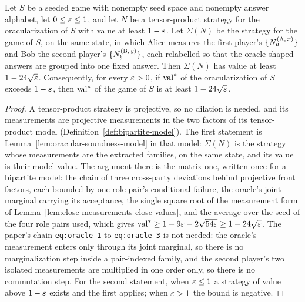 \begin{lemma}
\label{lem:oracular-soundness-tensor}
\leanok
Let $S$ be a seeded game with nonempty seed space and nonempty answer alphabet, let
$0 \leq \varepsilon \leq 1$, and let $N$ be a tensor-product strategy for the oracularization of $S$
with value at least $1 - \varepsilon$. Let $\Sigma(N)$ be the strategy for the game of $S$, on the same
state, in which Alice measures the first player's $\{N^{(\textsc{A},\, x)}_a\}$ and Bob the second
player's $\{N^{(\textsc{B},\, y)}_b\}$, each relabelled so that the oracle-shaped answers are grouped
into one fixed answer. Then $\Sigma(N)$ has value at least $1 - 24\sqrt{\varepsilon}$. Consequently, for
every $\varepsilon > 0$, if $\mathrm{val}^*$ of the oracularization of $S$ exceeds $1 - \varepsilon$, then
$\mathrm{val}^*$ of the game of $S$ is at least $1 - 24\sqrt{\varepsilon}$.
\end{lemma}
\begin{proof}
\leanok
A tensor-product strategy is projective, so no dilation is needed, and its measurements are
projective measurements in the two factors of its tensor-product model
(Definition~\ref{def:bipartite-model}). The first statement is
Lemma~\ref{lem:oracular-soundness-model} in that model: $\Sigma(N)$ is the strategy whose
measurements are the extracted families, on the same state, and its value is their model value.
The argument there is the matrix one, written once for a bipartite model: the chain of three
cross-party deviations behind projective front factors, each bounded by one role pair's
conditional failure, the oracle's joint marginal carrying its acceptance, the single square root
of the measurement form of Lemma~\ref{lem:close-measurements-close-values}, and the average over
the seed of the four role pairs used, which gives
$\mathrm{val}^* \geq 1 - 9\varepsilon - 2\sqrt{54\varepsilon} \geq 1 - 24\sqrt{\varepsilon}$. The paper's chain
\texttt{eq:oracle-1} to \texttt{eq:oracle-3} is not needed: the oracle's measurement enters only
through its joint marginal, so there is no marginalization step inside a pair-indexed family, and
the second player's two isolated measurements are multiplied in one order only, so there is no
commutation step. For the second statement, when $\varepsilon \leq 1$ a strategy of value above
$1 - \varepsilon$ exists and the first applies; when $\varepsilon > 1$ the bound is negative.
\end{proof}

